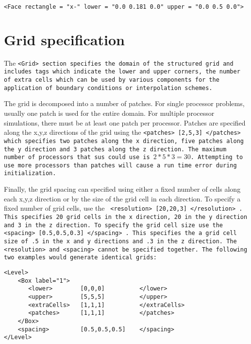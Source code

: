 \begin{Verbatim}[fontsize=\footnotesize]
 <Face rectangle = "x-" lower = "0.0 0.181 0.0" upper = "0.0 0.5 0.0">
\end{Verbatim}

%
\section{Grid specification} \label{Sec:Grid}

The \tt <Grid> \normalfont section specifies the domain of the
structured grid and includes tags which indicate the lower and upper
corners, the number of extra cells which can be used by various
components for the application of boundary conditions or interpolation
schemes.

The grid is decomposed into a number of patches.  For single processor
problems, usually one patch is used for the entire domain.  For
multiple processor simulations, there must be at least one patch per
processor.  Patches are specified along the x,y,z directions of the
grid using the \tt <patches> [2,5,3] </patches> \normalfont which
specifies two patches along the x direction, five patches along the y
direction and 3 patches along the z direction.  The maximum number of
processors that \tt sus \normalfont could use is $2*5*3 = 30$.
Attempting to use more processors than patches
will cause a run time error during initialization.

Finally, the grid spacing can specified using either a fixed number of
cells along each x,y,z direction or by the size of the grid cell in
each direction.  To specify a fixed number of grid cells, use the \tt
<resolution> [20,20,3] </resolution> \normalfont.  This specifies 20
grid cells in the x direction, 20 in the y direction and 3 in the z
direction.  To specify the grid cell size use the \tt <spacing>
[0.5,0.5,0.3] </spacing> \normalfont.  This specifies the a grid cell
size of .5 in the x and y directions and .3 in the z direction.  The
\tt <resolution> \normalfont and \tt <spacing> \normalfont cannot be
specified together.  The following two examples would generate
identical grids:

\begin{Verbatim}[fontsize=\footnotesize]
<Level>
    <Box label="1">
       <lower>        [0,0,0]          </lower>
       <upper>        [5,5,5]          </upper>
       <extraCells>   [1,1,1]          </extraCells>
       <patches>      [1,1,1]          </patches>
    </Box>
    <spacing>         [0.5,0.5,0.5]    </spacing>
</Level>
\end{Verbatim}

